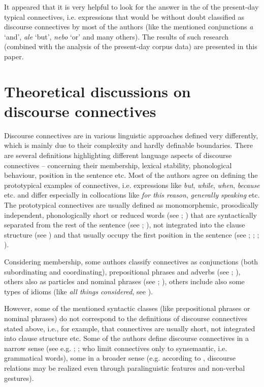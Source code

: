 \documentclass[output=paper]{langsci/langscibook.cls}
\begin{document}
It appeared that it is very helpful to look for the answer in the  of the present-day typical connectives, i.e. expressions that would be without doubt classified as discourse connectives by most of the authors (like the mentioned conjunctions \textit{a} `and', \textit{ale }`but', \textit{nebo} `or' and many others). The results of such research (combined with the analysis of the present-day corpus data) are presented in this paper.

\section{Theoretical discussions on discourse connectives}

Discourse connectives are in various linguistic approaches defined very differently, which is mainly due to their complexity and hardly definable boundaries. There are several definitions highlighting different language aspects of discourse connectives – concerning their  membership, lexical stability, phonological behaviour, position in the sentence etc. Most of the authors agree on defining the prototypical examples of connectives, i.e. expressions like \textit{but}, \textit{while}, \textit{when}, \textit{because} etc. and differ especially in  collocations like \textit{for this reason}, \textit{generally speaking} etc. The prototypical connectives are usually defined as monomorphemic, prosodically independent, phonologically short or reduced words (see 
\citealt{zwicky1985clitics}; \citealt{urgelles2010syntax}) that are syntactically separated from the rest of the sentence (see \citealt{deborah1987discourse}; \citealt{zwicky1985clitics}), not integrated into the clause structure (see \citealt{urgelles2010syntax}) and that usually occupy the first position in the sentence (see \citealt{deborah1987discourse}; \citealt{zwicky1985clitics}; \citealt{schourup1999discourse}; \citealt{fischer2006approaches}).

Considering  membership, some authors classify connectives as conjunctions (both subordinating and coordinating), prepositional phrases and adverbs (see \citealt{prasad2008penn}; \citealt{prasad2010realization}), others also as particles and nominal phrases (see \citealt{hansen1998function}; \citealt{aijmer2002english}), others include also some types of idioms (like \textit{all things considered}, see \citealt{fraser1999discourse}).

However, some of the mentioned syntactic classes (like prepositional phrases or nominal phrases) do not correspond to the definitions of discourse connectives stated above, i.e., for example, that connectives are usually short, not integrated into clause structure etc. Some of the authors define discourse connectives in a narrow sense (see e.g. \citealt{shloush1998unified}; \citealt{hakulinen1998use}; \citealt{maschler2000discourse} who limit connectives only to synsemantic, i.e. grammatical words), some in a broader sense (e.g. according to \citealt{deborah1987discourse}, discourse relations may be realized even through paralinguistic features and non-verbal gestures). 
\end{document}
